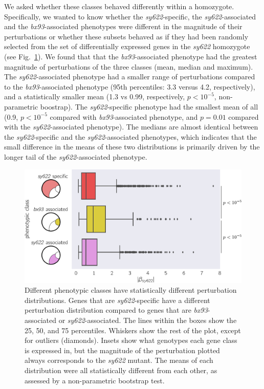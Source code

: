 \documentclass[10pt, onecolumn]{article}
\begin{document}
We asked whether these classes behaved differently within a homozygote.
Specifically, we wanted to know whether the \emph{sy622}-specific, the
\emph{sy622}-associated and the \emph{bx93}-associated phenotypes were different
in the magnitude of their perturbations or whether these subsets behaved as if
they had been randomly selected from the set of differentially expressed genes
in the \emph{sy622} homozygote (see Fig.~\ref{fig:classes}). We found that that
the \emph{bx93}-associated phenotype had the greatest magnitude of perturbations
of the three classes (mean, median and maximum). The \emph{sy622}-associated
phenotype had a smaller range of perturbations compared to the
\emph{bx93}-associated phenotype (95th percentiles: 3.3 versus 4.2,
respectively), and a statistically smaller mean (1.3 vs 0.99, respectively, $p <
10^{-5}$, non-parametric boostrap). The \emph{sy622}-specific phenotype had the
smallest mean of all (0.9, $p < 10^{-5}$ compared with \emph{bx93}-associated
phenotype, and $p = 0.01$ compared with the \emph{sy622}-associated phenotype).
The medians are almost identical between the \emph{sy622}-specific and the
\emph{sy622}-associated phenotypes, which indicates that the small difference in the
means of these two distributions is primarily driven by the longer tail of the
\emph{sy622}-associated phenotype.

\begin{figure}
  \centering{}
  \includegraphics[width=\textwidth]{../figs/dpy22_classes.pdf}
  \caption{
  Different phenotypic classes have statistically different perturbation
  distributions. Genes that are \emph{sy622}-specific have a different
  perturbation distribution compared to genes that are \emph{bx93}-associated or
  \emph{sy622}-associated. The lines within the boxes show the 25, 50, and 75
  percentiles. Whiskers show the rest of the plot, except for outliers (diamonds).
  Insets show what genotypes each gene class is
  expressed in, but the magnitude of the perturbation plotted always corresponds
  to the \emph{sy622} mutant. The means of each distribution were all statistically
  different from each other, as assessed by a non-parametric bootstrap test.
  }
\label{fig:classes}
\end{figure}
\end{document}
